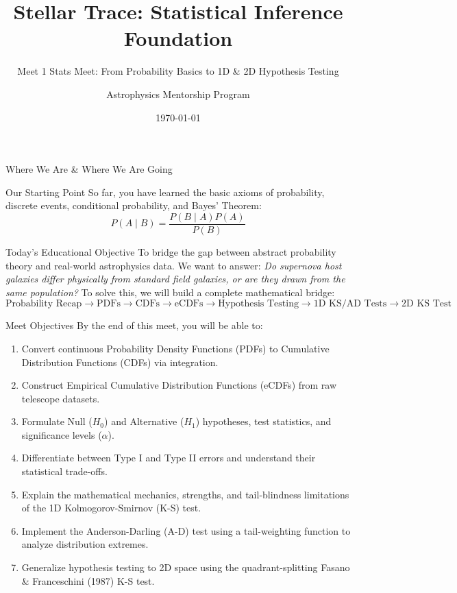 \documentclass[9pt]{beamer}
\title{Stellar Trace: Statistical Inference Foundation}
\subtitle{Meet 1 Stats Meet: From Probability Basics to 1D \& 2D Hypothesis Testing}
\author{Astrophysics Mentorship Program}
\date{\today}
\begin{document}
\maketitle

\begin{frame}{Where We Are \& Where We Are Going}
  \begin{block}{Our Starting Point}
    So far, you have learned the basic axioms of probability, discrete events, conditional probability, and Bayes' Theorem:
    $$P(A \mid B) = \frac{P(B \mid A)P(A)}{P(B)}$$
  \end{block}
  \begin{block}{Today's Educational Objective}
    To bridge the gap between abstract probability theory and real-world astrophysics data. We want to answer:
    \textit{Do supernova host galaxies differ physically from standard field galaxies, or are they drawn from the same population?}
    To solve this, we will build a complete mathematical bridge:
    $$\text{Probability Recap} \rightarrow \text{PDFs} \rightarrow \text{CDFs} \rightarrow \text{eCDFs} \rightarrow \text{Hypothesis Testing} \rightarrow \text{1D KS/AD Tests} \rightarrow \text{2D KS Test}$$
  \end{block}
\end{frame}

\begin{frame}{Meet Objectives}
  By the end of this meet, you will be able to:
  \begin{enumerate}
    \item Convert continuous Probability Density Functions (PDFs) to Cumulative Distribution Functions (CDFs) via integration.
    \item Construct Empirical Cumulative Distribution Functions (eCDFs) from raw telescope datasets.
    \item Formulate Null ($H_0$) and Alternative ($H_1$) hypotheses, test statistics, and significance levels ($\alpha$).
    \item Differentiate between Type I and Type II errors and understand their statistical trade-offs.
    \item Explain the mathematical mechanics, strengths, and tail-blindness limitations of the 1D Kolmogorov-Smirnov (K-S) test.
    \item Implement the Anderson-Darling (A-D) test using a tail-weighting function to analyze distribution extremes.
    \item Generalize hypothesis testing to 2D space using the quadrant-splitting Fasano \& Franceschini (1987) K-S test.
  \end{enumerate}
\end{frame}
\end{document}
